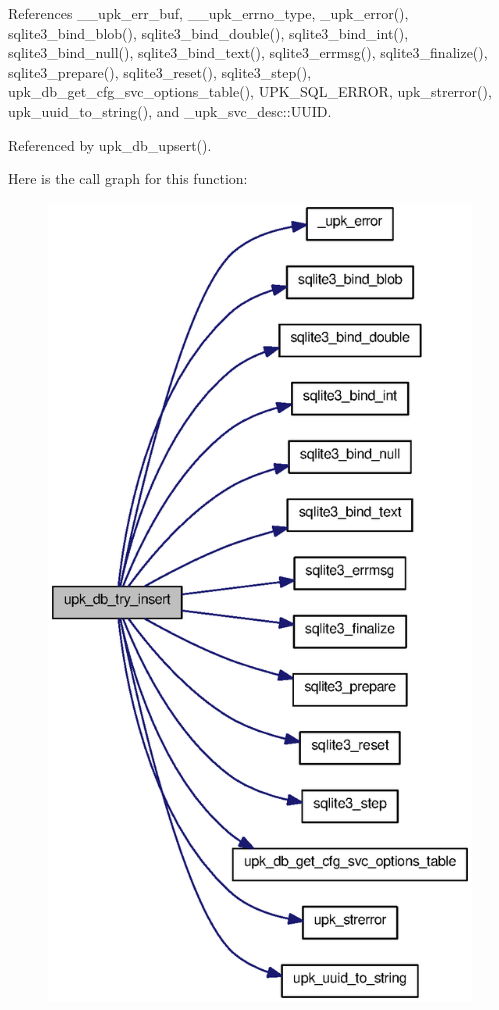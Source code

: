 References \_\-\_\-upk\_\-err\_\-buf, \_\-\_\-upk\_\-errno\_\-type, \_\-upk\_\-error(), sqlite3\_\-bind\_\-blob(), sqlite3\_\-bind\_\-double(), sqlite3\_\-bind\_\-int(), sqlite3\_\-bind\_\-null(), sqlite3\_\-bind\_\-text(), sqlite3\_\-errmsg(), sqlite3\_\-finalize(), sqlite3\_\-prepare(), sqlite3\_\-reset(), sqlite3\_\-step(), upk\_\-db\_\-get\_\-cfg\_\-svc\_\-options\_\-table(), UPK\_\-SQL\_\-ERROR, upk\_\-strerror(), upk\_\-uuid\_\-to\_\-string(), and \_\-upk\_\-svc\_\-desc::UUID.



Referenced by upk\_\-db\_\-upsert().



Here is the call graph for this function:
\nopagebreak
\begin{figure}[H]
\begin{center}
\leavevmode
\includegraphics[height=600pt]{tp_8c_abfb48e1a43743a5203be067fac95c23c_cgraph}
\end{center}
\end{figure}




